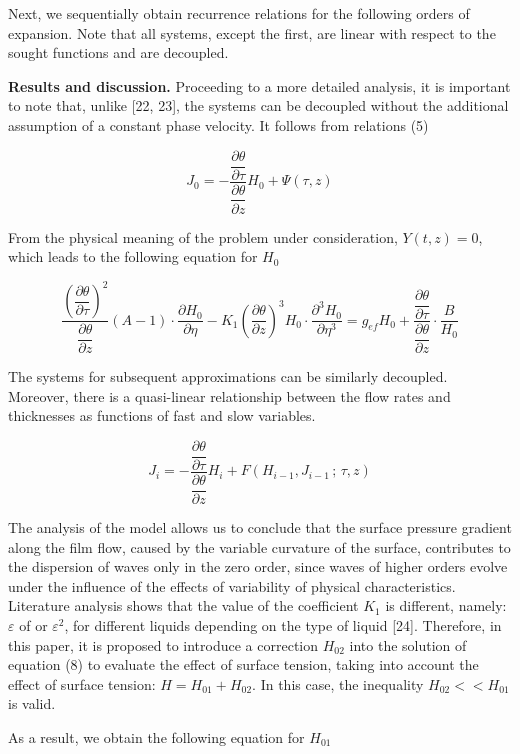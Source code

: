 \begin{multicols}{2}
Next, we sequentially obtain recurrence relations for the following
orders of expansion. Note that all systems, except the first, are linear
with respect to the sought functions and are decoupled.

{\bfseries Results and discussion.} Proceeding to a more detailed analysis,
it is important to note that, unlike {[}22, 23{]}, the systems can be
decoupled without the additional assumption of a constant phase
velocity. It follows from relations (5)

\begin{equation}
J_0 = - \frac{\dfrac{\partial \theta}{\partial \tau}}{\dfrac{\partial \theta}{\partial z}} H_0 + \Psi(\tau, z)
\end{equation}

From the physical meaning of the problem under consideration,
$Y(t,z)=0$, which leads to the following equation for $H_0$
\end{multicols}

\begin{equation}
\frac{\left( \dfrac{\partial \theta}{\partial \tau} \right)^2}{\dfrac{\partial \theta}{\partial z}} (A - 1) \cdot \frac{\partial H_0}{\partial \eta}
- K_1 \left( \frac{\partial \theta}{\partial z} \right)^3 H_0 \cdot \frac{\partial^3 H_0}{\partial \eta^3}
= g_{\mathit{ef}} H_0 + \frac{\dfrac{\partial \theta}{\partial \tau}}{\dfrac{\partial \theta}{\partial z}} \cdot \frac{B}{H_0}
\end{equation}

\begin{multicols}{2}
The systems for subsequent approximations can be similarly decoupled.
Moreover, there is a quasi-linear relationship between the flow rates
and thicknesses as functions of fast and slow variables.

\begin{equation}
J_i = - \frac{\dfrac{\partial \theta}{\partial \tau}}{\dfrac{\partial \theta}{\partial z}} H_i + F\left(H_{i-1}, J_{i-1} \, ; \, \tau, z \right)
\end{equation}

The analysis of the model allows us to conclude that the surface
pressure gradient along the film flow, caused by the variable
curvature of the surface, contributes to the dispersion of waves only
in the zero order, since waves of higher orders evolve under the
influence of the effects of variability of physical
characteristics. Literature analysis shows that the value of the
coefficient $K_1$ is different, namely: $\varepsilon$ of or
$\varepsilon^2$, for different liquids depending on the type of liquid
{[}24{]}.  Therefore, in this paper, it is proposed to introduce a
correction $H_{02}$ into the solution of equation (8) to evaluate the
effect of surface tension, taking into account the effect of surface
tension: $H=H_{01}+H_{02}$.  In this case, the inequality
$H_{02}<<H_{01}$ is valid.

As a result, we obtain the following equation for $H_{01}$
\end{multicols}

